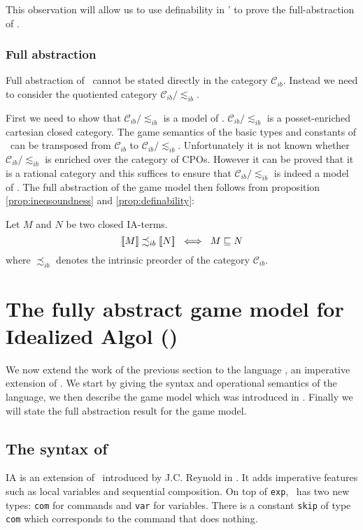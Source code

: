 This observation will allow us to use definability in \pcf' to
prove the full-abstraction of \pcf.


\subsubsection{Full abstraction}

Full abstraction of \pcf\ cannot be stated directly in the category $\mathcal{C}_{ib}$. Instead we need to consider the quotiented category
$\mathcal{C}_{ib}/\lesssim_{ib}$.

First we need to show that $\mathcal{C}_{ib}/\lesssim_{ib}$ is a
model of \pcf. $\mathcal{C}_{ib}/\lesssim_{ib}$ is a posset-enriched
cartesian closed category. The game semantics of the basic types and
constants of \pcf\ can be transposed from $\mathcal{C}_{ib}$ to
$\mathcal{C}_{ib}/\lesssim_{ib}$. Unfortunately it is not known
whether $\mathcal{C}_{ib}/\lesssim_{ib}$ is enriched over the
category of CPOs. However it can be proved that it is a rational
category \citep{abramsky94full} and this suffices to ensure that
$\mathcal{C}_{ib}/\lesssim_{ib}$ is indeed a model of \pcf. The full
abstraction of the game model then follows from proposition
\ref{prop:ineqsoundness} and \ref{prop:definability}:
\begin{thm}
Let $M$ and $N$ be two closed IA-terms.
$${[\![ M ]\!]} \precsim_{ib} {[\![ N ]\!]} \ \iff \ M \sqsubseteq N$$
where $\precsim_{ib}$ denotes the intrinsic preorder of the category $\mathcal{C}_{ib}$.
\end{thm}

\section{The fully abstract game model for Idealized Algol (\ialgol)}

We now extend the work of the previous section to the language
\ialgol, an imperative extension of \pcf. We start by giving the
syntax and operational semantics of the language, we then describe
the game model which was introduced in \cite{abramsky99full}.
Finally we will state the full abstraction result for the game
model.

\subsection{The syntax of \ialgol}
IA is an extension of \pcf\ introduced by J.C. Reynold in
\cite{Reynolds81}. It adds imperative features such as local
variables and sequential composition. On top of \texttt{exp}, \pcf\
has two new types: \texttt{com} for commands and \texttt{var} for
variables. There is a constant \texttt{skip} of type \texttt{com}
which corresponds to the command that does nothing.

